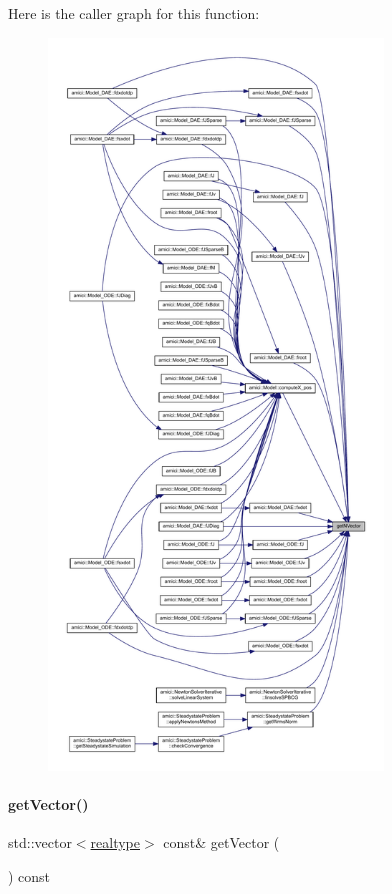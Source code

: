 Here is the caller graph for this function\+:
\nopagebreak
\begin{figure}[H]
\begin{center}
\leavevmode
\includegraphics[height=550pt]{classamici_1_1_ami_vector_acf288b105b2fa4520d0d73f828687533_icgraph}
\end{center}
\end{figure}
\mbox{\label{classamici_1_1_ami_vector_a5f73cf1c7b6769c44dfb51b048ec4d63}} 
\paragraph{\texorpdfstring{getVector()}{getVector()}}
{\footnotesize\ttfamily std\+::vector$<$\mbox{\hyperlink{namespaceamici_a1bdce28051d6a53868f7ccbf5f2c14a3}{realtype}}$>$ const\& get\+Vector (\begin{DoxyParamCaption}{ }\end{DoxyParamCaption}) const}


